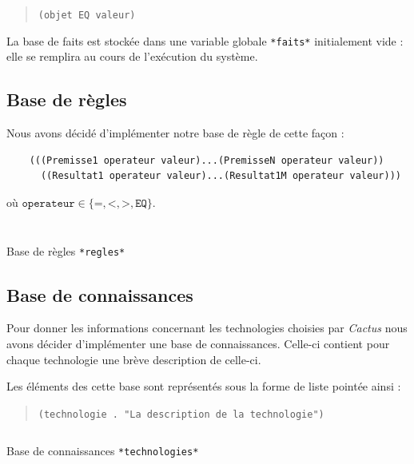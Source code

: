 \documentclass[a4paper,12pt]{article}
\begin{document}
\begin{quotation}
	\texttt{(objet EQ valeur)}
\end{quotation}

La base de faits est stockée dans une variable globale \texttt{*faits*} initialement vide : elle se remplira au cours de l'exécution du système.

\subsection{Base de règles}
Nous avons décidé d'implémenter notre base de règle de cette façon :

\begin{verbatim}
	(((Premisse1 operateur valeur)...(PremisseN operateur valeur))
  	  ((Resultat1 operateur valeur)...(Resultat1M operateur valeur)))
\end{verbatim}
où $\texttt{operateur} \in \{\texttt{=},\texttt{<},\texttt{>},\texttt{EQ}\} $.
\begin{listing}[H]
	\centering
	\inputminted[breaklines=true,linenos,lastline=29]{lisp}{../regles.lisp}
\end{listing}

\begin{listing}[H]
	\centering
	\inputminted[breaklines=true,linenos,firstline=30]{lisp}{../regles.lisp}
	\caption{Base de règles \texttt{*regles*}}
\end{listing}

\subsection{Base de connaissances}
Pour donner les informations concernant les technologies choisies par \textit{Cactus} nous avons décider d'implémenter une base de connaissances. Celle-ci contient pour chaque technologie une brève description de celle-ci.

Les éléments des cette base sont représentés sous la forme de liste pointée ainsi :

\begin{quotation}
	\texttt{(technologie . "La description de la technologie")}
\end{quotation}

\begin{listing}[H]
	\centering
	\inputminted[breaklines=true,linenos,lastline=26]{lisp}{../technologies.lisp}
	\caption{Base de connaissances \texttt{*technologies*}}
\end{listing}
\end{document}
